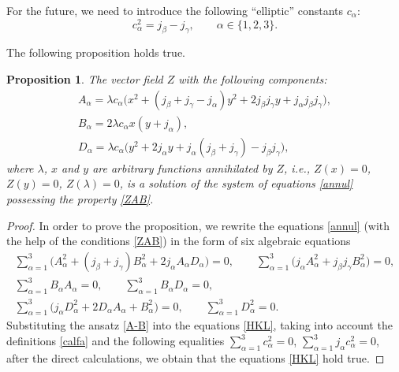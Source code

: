 \documentclass[10pt,a4paper]{amsart}
\def\a{\alpha}
\def\b{\beta}
\def\g{\gamma}
\def\l{\lambda}
\numberwithin{equation}{section}
\newtheorem{Proposition}[Theorem]{Proposition}
\begin{document}
For the future, we need to introduce the following ``elliptic'' constants $c_{\a}$:
\begin{equation}\label{calfa}
c^2_{\a}=j_{\b}-j_{\g}, \qquad \a\in \{1,2,3\}.
\end{equation}

The following proposition holds true.
\begin{Proposition}
The vector field $Z$ with the following components:
\begin{subequations}\label{A-B}
\begin{gather}
A_{\a} =\l c_{\a} \big(x^2+(j_{\b}+j_{\g}-j_{\a}) y^2+2 j_{\b} j_{\g} y + j_{\a} j_{\b} j_{\g}\big),\label{Ai}
\\
B_{\a} = 2 \l c_{\a} x (y+j_{\a}),\label{Bi}
\\
D_{\a} = \l c_{\a} \big(y^2+2j_{\a} y+ j_{\a}(j_{\b}+j_{\g})-j_{\b}j_{\g}\big) ,\label{Di}
\end{gather}
\end{subequations}
where $\l$, $x$ and $y$ are arbitrary functions annihilated
by $Z$, i.e., $Z(x)=0$, $Z(y)=0$, $Z(\l)=0$, is a solution of the system
of equations \eqref{annul} possessing the property \eqref{ZAB}.
\end{Proposition}

\begin{proof}
 In order to prove the proposition, we rewrite the equations \eqref{annul} (with the help of the conditions \eqref{ZAB}) in the form of six algebraic equations
\begin{subequations}\label{HKL}
\begin{gather}
\sum\limits_{\a=1}^3 \big(A_{\a}^2+ (j_{\b}+j_{\g}) B^2_{\a}+ 2 j_{\a} A_{\a} D_{\a}\big)=0, \qquad
 \sum\limits_{\a=1}^3 \big(j_{\a} A_{\a}^2+ j_{\b}j_{\g} B^2_{\a}\big)=0, \label{H}\\ \sum_{\a=1}^3B_{\a}A_{\a}=0,
\qquad
\sum_{\a=1}^3B_{\a}D_{\a}=0,\\
 \sum_{\a=1}^3 \big(j_{\a} D^2_{\a} + 2 D_{\a} A_{\a} +B_{\a}^2 \big)=0, \qquad \sum_{\a=1}^3 D^2_{\a}=0.\label{C3}
\end{gather}
\end{subequations}
Substituting the ansatz \eqref{A-B} into the equations \eqref{HKL}, taking into account the definitions
\eqref{calfa} and the following equalities
$
\sum_{\a=1}^3 c_{\a}^2=0$, $ \sum_{\a=1}^3 j_{\a} c_{\a}^2=0$,
after the direct calculations, we obtain that the equations \eqref{HKL} hold true.
\end{proof}
\end{document}
